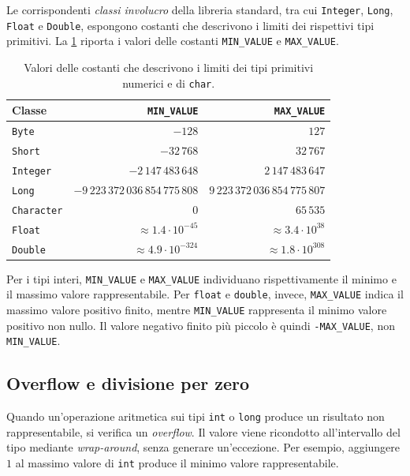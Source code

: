 Le corrispondenti \emph{classi involucro} della libreria
standard, tra cui \texttt{Integer}, \texttt{Long},
\texttt{Float} e \texttt{Double}, espongono costanti
che descrivono i limiti dei rispettivi tipi primitivi.
La \cref{tab:fi-java-limiti-primitivi} riporta i valori
delle costanti \texttt{MIN\_VALUE} e
\texttt{MAX\_VALUE}.

\begin{table}[htbp]
  \centering
  \small
  \begin{tabular}{lrr}
    \hline
    Classe & \texttt{MIN\_VALUE} & \texttt{MAX\_VALUE} \\
    \hline
    \texttt{Byte}
      & \(-128\)
      & \(127\) \\
    \texttt{Short}
      & \(-32\,768\)
      & \(32\,767\) \\
    \texttt{Integer}
      & \(-2\,147\,483\,648\)
      & \(2\,147\,483\,647\) \\
    \texttt{Long}
      & \(-9\,223\,372\,036\,854\,775\,808\)
      & \(9\,223\,372\,036\,854\,775\,807\) \\
    \texttt{Character}
      & \(0\)
      & \(65\,535\) \\
    \texttt{Float}
      & \(\approx 1.4\cdot10^{-45}\)
      & \(\approx 3.4\cdot10^{38}\) \\
    \texttt{Double}
      & \(\approx 4.9\cdot10^{-324}\)
      & \(\approx 1.8\cdot10^{308}\) \\
    \hline
  \end{tabular}
  \caption{Valori delle costanti che descrivono i limiti
  dei tipi primitivi numerici e di \texttt{char}.}
  \label{tab:fi-java-limiti-primitivi}
\end{table}

Per i tipi interi, \texttt{MIN\_VALUE} e
\texttt{MAX\_VALUE} individuano rispettivamente il minimo
e il massimo valore rappresentabile. Per \texttt{float}
e \texttt{double}, invece, \texttt{MAX\_VALUE} indica
il massimo valore positivo finito, mentre
\texttt{MIN\_VALUE} rappresenta il minimo valore positivo
non nullo. Il valore negativo finito più piccolo è quindi
\texttt{-MAX\_VALUE}, non \texttt{MIN\_VALUE}.

\clearpage

\subsection{Overflow e divisione per zero}
\label{sec:fi-java-overflow}

Quando un'operazione aritmetica sui tipi \texttt{int} o
\texttt{long} produce un risultato non rappresentabile,
si verifica un \emph{overflow}. Il valore viene ricondotto
all'intervallo del tipo mediante \emph{wrap-around}, senza
generare un'eccezione. Per esempio, aggiungere \(1\) al
massimo valore di \texttt{int} produce il minimo valore
rappresentabile.

